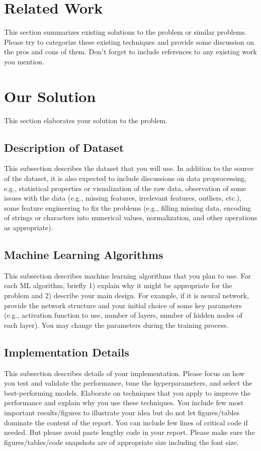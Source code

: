\documentclass[conference]{IEEEtran}
\begin{document}
\section{Related Work}
This section summarizes existing solutions to the problem or similar problems. Please try to categorize these existing techniques and provide some discussion on the pros and cons of them. Don't forget to include references to any existing work you mention.  

\section{Our Solution}
This section elaborates your solution to the problem.

\subsection{Description of Dataset}
This subsection describes the dataset that you will use. In addition to the source of the dataset, it is also expected to include discussions on data proprocessing, e.g.,  statistical properties or visualization of the raw data, observation of some issues with the data (e.g., missing features, irrelevant features, outliers, etc.), some feature engineering to fix the problems (e.g., filling missing data, encoding of strings or characters into numerical values, normalization, and other operations as appropriate).

\subsection{Machine Learning Algorithms}
This subsection describes machine learning algorithms that you plan to use. For each ML algorithm, briefly 1) explain why it might be appropriate for the problem and 2) describe your main design. For example, if it is neural network, provide the network structure and your initial choice of some key parameters (e.g., activation function to use, number of layers, number of hidden nodes of each layer). You may change the parameters during the training process.  

\subsection{Implementation Details}
This subsection describes details of your implementation. Please focus on how you test and validate the performance, tune the hyperparameters, and select the best-performing models. Elaborate on techniques that you apply to improve the performance and explain why you use these techniques. You include few most important results/figures to illustrate your idea but do not let figures/tables dominate the content of the report. You can include few lines of critical code if needed. But please avoid paste lengthy code in your report. Please make sure the figures/tables/code snapshots are of appropriate size including the font size.
\end{document}
